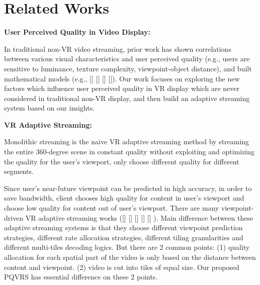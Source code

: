 \section{Related Works}

\textbf{User Perceived Quality in Video Display:}

In traditional non-VR video streaming, prior work has shown correlations between various visual characteristics and user perceived quality (e.g., users are sensitive to luminance, texture complexity, viewpoint-object distance), and built mathematical models (e.g., [] [] [] []). Our work focuses on exploring the new factors which influence user perceived quality in VR display which are never considered in traditional non-VR display, and then build an adaptive streaming system based on our insights.

\textbf{VR Adaptive Streaming:}

Monolithic streaming is the naive VR adaptive streaming method by streaming the entire 360-degree scene in constant quality without exploiting and optimizing the quality for the user’s viewport, only choose different quality for different segments.

Since user's near-future viewpoint can be predicted in high accuracy,  in order to save bandwidth, client chooses high quality for content in user's viewport and choose low quality for content out of user's viewport. There are many viewpoint-driven VR adaptive streaming works ([] [] [] [] [] ). Main difference between these adaptive streaming systems is that they choose different viewpoint prediction strategies, different rate allocation strategies, different tiling granularities and different multi-tiles decoding logics. But there are 2 common points: (1) quality allocation for each spatial part of the video is only based on the distance between content and viewpoint. (2) video is cut into tiles of equal size. Our proposed PQVRS has essential difference on these 2 points.